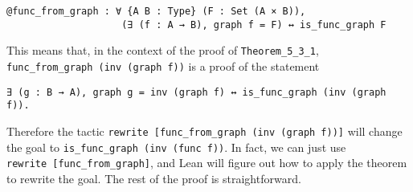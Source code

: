 \documentclass[
  letterpaper,
  DIV=11,
  numbers=noendperiod]{scrreprt}
\newenvironment{ind}
	{\begin{list}{}{\setlength{\leftmargin}{1em}}\item\relax}
	{\end{list}}
\theoremstyle{remark}
\begin{document}
\begin{ind}

\begin{verbatim}
@func_from_graph : ∀ {A B : Type} (F : Set (A × B)),
                    (∃ (f : A → B), graph f = F) ↔ is_func_graph F
\end{verbatim}

\end{ind}

This means that, in the context of the proof of
\texttt{Theorem\_5\_3\_1}, \texttt{func\_from\_graph\ (inv\ (graph\ f))}
is a proof of the statement

\begin{ind}

\begin{verbatim}
∃ (g : B → A), graph g = inv (graph f) ↔ is_func_graph (inv (graph f)).
\end{verbatim}

\end{ind}

Therefore the tactic
\texttt{rewrite\ {[}func\_from\_graph\ (inv\ (graph\ f)){]}} will change
the goal to \texttt{is\_func\_graph\ (inv\ (func\ f))}. In fact, we can
just use \texttt{rewrite\ {[}func\_from\_graph{]}}, and Lean will figure
out how to apply the theorem to rewrite the goal. The rest of the proof
is straightforward.
\end{document}
